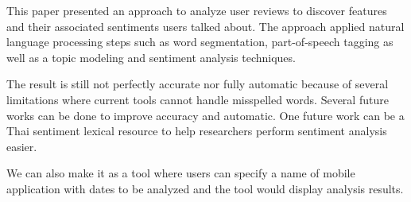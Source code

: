 This paper presented an approach to analyze user reviews to discover features and their associated sentiments users talked about. The approach applied natural language processing steps such as word segmentation, part-of-speech tagging as well as a topic modeling and sentiment analysis techniques.

The result is still not perfectly accurate nor fully automatic because of several limitations where current tools cannot handle misspelled words. Several future works can be done to improve accuracy and automatic. One future work can be a Thai sentiment lexical resource to help researchers perform sentiment analysis easier.

We can also make it as a tool where users can specify a name of mobile application with dates to be analyzed and the tool would display analysis results.